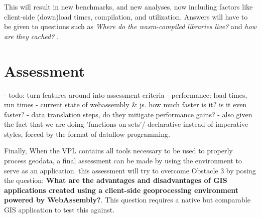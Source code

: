 This will result in new benchmarks, and new analyses, now including factors like client-side (down)load times, compilation, and utilization. Answers will have to be given to questions such as \textit{Where do the wasm-compiled libraries live?} and \textit{ how are they cached? }.



\section{Assessment}
\label{sec:method-four}
\mySubRQFour

\begin{note}
  - todo: turn features around into assessment criteria
  - performance: load times, run times
  - current state of webassembly & js. how much faster is it? is it even faster? 
     - data translation steps, do they mitigate performance gains? 
     - also given the fact that we are doing 'functions on sets'/ declarative instead of imperative styles, forced by the format of dataflow programming. 

\end{note}

Finally, When the VPL contains all tools necessary to be used to properly process geodata, a final assessment can be made by using the environment to serve as an application. this assessment will try to overcome Obstacle 3 by posing the question: \textbf{What are the advantages and disadvantages of GIS applications created using a client-side geoprocessing environment powered by WebAssembly?}. This question requires a native but comparable GIS application to test this against.  

